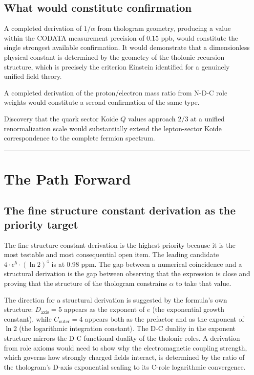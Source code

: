 \documentclass[12pt]{article}
\begin{document}
\subsection{What would constitute confirmation}\label{what-would-constitute-confirmation}

A completed derivation of \(1/\alpha\) from thologram geometry,
producing a value within the CODATA measurement precision of \(0.15\)
ppb, would constitute the single strongest available confirmation. It
would demonstrate that a dimensionless physical constant is determined
by the geometry of the tholonic recursion structure, which is precisely
the criterion Einstein identified for a genuinely unified field theory.

A completed derivation of the proton/electron mass ratio from N-D-C role
weights would constitute a second confirmation of the same type.

Discovery that the quark sector Koide \(Q\) values approach \(2/3\) at a
unified renormalization scale would substantially extend the
lepton-sector Koide correspondence to the complete fermion spectrum.

\begin{center}\rule{0.5\linewidth}{0.5pt}\end{center}

\section{The Path Forward}\label{the-path-forward}

\subsection{The fine structure constant derivation as the priority target}\label{the-fine-structure-constant-derivation-as-the-priority-target}

The fine structure constant derivation is the highest priority because
it is the most testable and most consequential open item. The leading
candidate \(4 \cdot e^5 \cdot (\ln 2)^4\) is at 0.98 ppm. The gap
between a numerical coincidence and a structural derivation is the gap
between observing that the expression is close and proving that the
structure of the thologram constrains \(\alpha\) to take that value.

The direction for a structural derivation is suggested by the formula's
own structure: \(D_{\text{axis}} = 5\) appears as the exponent of \(e\)
(the exponential growth constant), while \(C_{\text{outer}} = 4\)
appears both as the prefactor and as the exponent of \(\ln 2\) (the
logarithmic integration constant). The D-C duality in the exponent
structure mirrors the D-C functional duality of the tholonic roles. A
derivation from role axioms would need to show why the electromagnetic
coupling strength, which governs how strongly charged fields interact,
is determined by the ratio of the thologram's D-axis exponential scaling
to its C-role logarithmic convergence.
\end{document}
